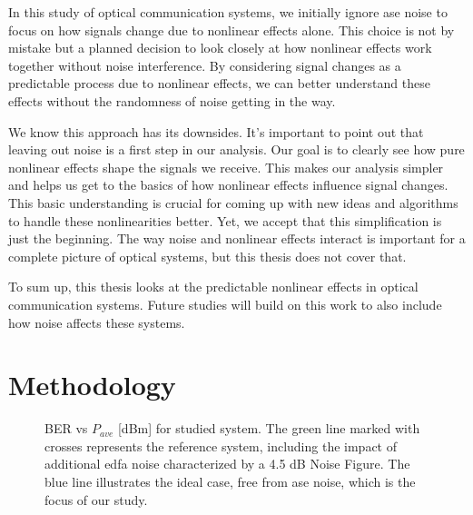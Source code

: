 In this study of optical communication systems, we initially ignore \acrfull{ase} noise to focus on how signals change due to nonlinear effects alone. This choice is not by mistake but a planned decision to look closely at how nonlinear effects work together without noise interference. By considering signal changes as a predictable process due to nonlinear effects, we can better understand these effects without the randomness of noise getting in the way.

We know this approach has its downsides. It's important to point out that leaving out noise is a first step in our analysis. Our goal is to clearly see how pure nonlinear effects shape the signals we receive. This makes our analysis simpler and helps us get to the basics of how nonlinear effects influence signal changes. This basic understanding is crucial for coming up with new ideas and algorithms to handle these nonlinearities better.
Yet, we accept that this simplification is just the beginning. The way noise and nonlinear effects interact is important for a complete picture of optical systems, but this thesis does not cover that.

To sum up, this thesis looks at the predictable nonlinear effects in optical communication systems. Future studies will build on this work to also include how noise affects these systems.


\section{Methodology}

\begin{figure}[htpb]
    \caption{BER vs $P_{ave}$ \textrm{[dBm]} for studied system. The green line marked with crosses represents the reference system, including the impact of additional \acrshort{edfa} noise characterized by a 4.5 dB Noise Figure. The blue line illustrates the ideal case, free from \acrshort{ase} noise, which is the focus of our study.
    }
    \label{fig:ber_vs_pave_z1200}
\end{figure}

